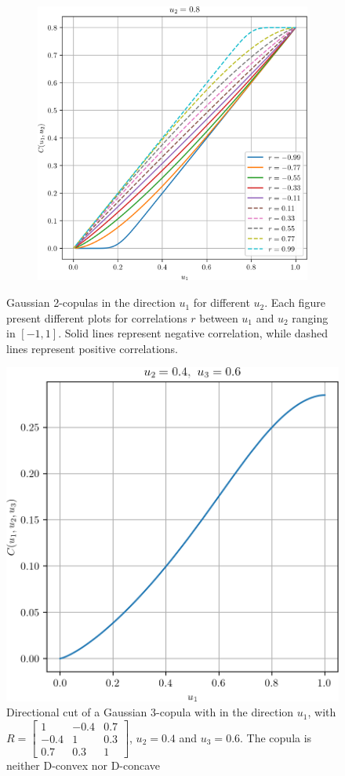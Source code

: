 \begin{figure}
\begin{subfigure}{0.4\linewidth}
    \end{subfigure}\hfill
    \begin{subfigure}{0.4\linewidth}
        \centering
        \includegraphics[width=\linewidth]{Images/Guassian_copula/gaussian_copula_2.png}
    \end{subfigure}
    \caption{Gaussian 2-copulas in the direction $u_1$ for different $u_2$. Each figure present different plots for correlations $r$ between $u_1$ and $u_2$ ranging in $[-1,1]$. Solid lines represent negative correlation, while dashed lines represent positive correlations.}
    \label{fig:gaussian_copula_simu}
\end{figure}

\begin{figure}
    \centering
    \includegraphics[width=0.5\linewidth]{Images/Guassian_copula/gaussian_copula_n3.png}
    \caption{Directional cut of a Gaussian 3-copula with in the direction $u_1$, with $R=\begin{bmatrix} 1 & -0.4 & 0.7\\ -0.4 & 1 & 0.3\\ 0.7 & 0.3 & 1 \end{bmatrix}$, $u_2=0.4$ and $u_3=0.6$. The copula is neither D-convex nor D-concave}
    \label{fig:gaussian_copula_simu_n3}
\end{figure}

